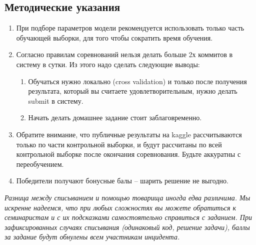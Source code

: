\documentclass[a4paper, 12pt]{article}
\begin{document}
\subsection*{Методические указания}
  \begin{enumerate}
  \item При подборе параметров модели рекомендуется использовать только часть обучающей выборки, для того чтобы сократить время обучения. 
  \item Согласно правилам соревнований нельзя делать больше 2х коммитов в систему в сутки. Из этого надо сделать следующие выводы:
  \begin{enumerate}
      \item Обучаться нужно локально (cross validation) и только после получения результата, который вы считаете удовлетворительным, нужно делать submit в систему.
      \item Начать делать домашнее задание стоит заблаговременно. 
  \end{enumerate}
  \item Обратите внимание, что публичные результаты на kaggle рассчитываются только по части контрольной выборки, и будут рассчитаны по всей контрольной выборке после окончания соревнования. Будьте аккуратны с переобучением.  
  \item Победители получают бонусные балы -- шарить решение не выгодно.
\end{enumerate}
\vspace{5cm}
\emph{Разница между списыванием и помощью товарища иногда едва различима. Мы искренне надеемся, что при любых сложностях вы можете обратиться к семинаристам и с их подсказками самостоятельно справиться с заданием. При зафиксированных случаях списывания (одинаковый код, решение задачи), баллы за задание будут обнулены всем участникам инцидента.}
\end{document}
